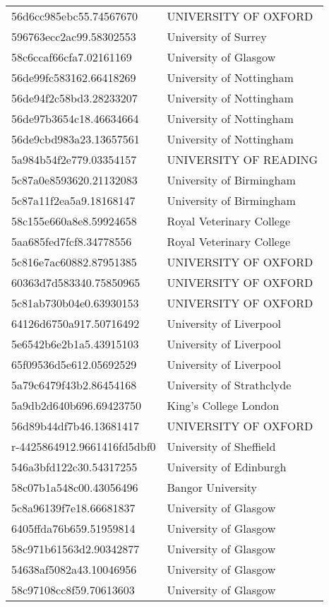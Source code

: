 \begin{tabular}{ll}
56d6cc985ebc55.74567670 & UNIVERSITY OF OXFORD \\
596763ecc2ac99.58302553 & University of Surrey \\
58c6ccaf66cfa7.02161169 & University of Glasgow \\
56de99fc583162.66418269 & University of Nottingham \\
56de94f2c58bd3.28233207 & University of Nottingham \\
56de97b3654c18.46634664 & University of Nottingham \\
56de9cbd983a23.13657561 & University of Nottingham \\
5a984b54f2e779.03354157 & UNIVERSITY OF READING \\
5c87a0e8593620.21132083 & University of Birmingham \\
5c87a11f2ea5a9.18168147 & University of Birmingham \\
58c155e660a8e8.59924658 & Royal Veterinary College \\
5aa685fed7fcf8.34778556 & Royal Veterinary College \\
5c816e7ac60882.87951385 & UNIVERSITY OF OXFORD \\
60363d7d583340.75850965 & UNIVERSITY OF OXFORD \\
5c81ab730b04e0.63930153 & UNIVERSITY OF OXFORD \\
64126d6750a917.50716492 & University of Liverpool \\
5e6542b6e2b1a5.43915103 & University of Liverpool \\
65f09536d5e612.05692529 & University of Liverpool \\
5a79c6479f43b2.86454168 & University of Strathclyde \\
5a9db2d640b696.69423750 & King's College London \\
56d89b44df7b46.13681417 & UNIVERSITY OF OXFORD \\
r-4425864912.9661416fd5dbf0 & University of Sheffield \\
546a3bfd122c30.54317255 & University of Edinburgh \\
58c07b1a548c00.43056496 & Bangor University \\
5c8a96139f7e18.66681837 & University of Glasgow \\
6405ffda76b659.51959814 & University of Glasgow \\
58c971b61563d2.90342877 & University of Glasgow \\
54638af5082a43.10046956 & University of Glasgow \\
58c97108cc8f59.70613603 & University of Glasgow \\

\end{tabular}
